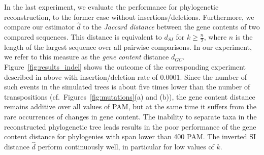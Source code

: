 \documentclass[9pt,english,utf8]{article}
\begin{document}
\medskip
In the last experiment, we evaluate the performance for phylogenetic
reconstruction, to the former case without insertions/deletions. Furthermore,
we compare our estimator $\hat d$ to the \emph{Jaccard distance} between the
gene contents of two compared sequences.  This distance is equivalent to
$d_{SI}$ for $k \geq \frac{n}{2}$, where $n$ is the length of the largest
sequence over all pairwise comparisons. In our experiment, we refer to this
measure as the \emph{gene content} distance $d_{GC}$.
Figure~\ref{fig:results_indel} shows the outcome of the corresponding
experiment described in above with insertion/deletion rate of $0.0001$. Since
the number of such events in the simulated trees is about five times lower than
the number of transpositions (cf.~Figures~\ref{fig:mutations}(a) and (b)), the
gene content distance remains additive over all values of PAM, but at the same
time it suffers from the rare occurrences of changes in gene content. The
inability to separate taxa in the reconstructed phylogenetic tree leads results
in the poor performance of the gene content distance for phylogenies with span
lower than 400 PAM. The inverted SI distance $\hat d$ perform continuously
well, in particular for low values of $k$. 

\FloatBarrier

 
 
\end{document}
